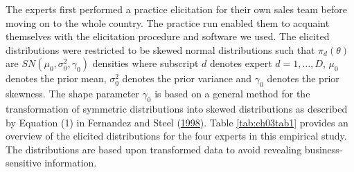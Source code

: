 \documentclass[openright,titlepage,12pt,a4paper]{book}
\begin{document}
The experts first performed a practice elicitation for their own sales team before moving on to the whole country. The practice run enabled them to acquaint themselves with the elicitation procedure and software we used. The elicited distributions were restricted to be skewed normal distributions such that \(\pi_d(\theta)\) are \(SN(\mu_0,\sigma^2_0,\gamma_0)\) densities where subscript \(d\) denotes expert \(d = 1,...,D\), \(\mu_0\) denotes the prior mean, \(\sigma^2_0\) denotes the prior variance and \(\gamma_0\) denotes the prior skewness. The shape parameter \(\gamma_0\) is based on a general method for the transformation of symmetric distributions into skewed distributions as described by Equation (1) in Fernandez and Steel (\protect\hyperlink{ref-fernandez_bayesian_1998-1}{1998}). Table \ref{tab:ch03tab1} provides an overview of the elicited distributions for the four experts in this empirical study. The distributions are based upon transformed data to avoid revealing business-sensitive information.
\end{document}

